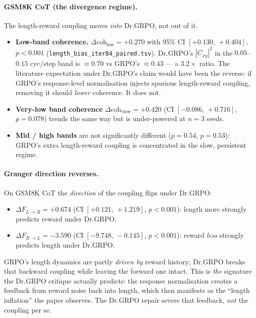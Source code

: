 \paragraph{GSM8K CoT (the divergence regime).}
The length-reward coupling moves \emph{into} Dr.GRPO, not out of it.
\begin{itemize}
\item \textbf{Low-band coherence.} $\Delta\mathrm{coh}_{\mathrm{low}}=+0.270$
with 95\% CI $[+0.130,\,+0.404]$, $p<0.001$
(\texttt{length\_bias\_iter84\_paired.tsv}). Dr.GRPO's $|C_{xy}|^2$
in the $0.05$--$0.15$ cyc/step band is $\approx 0.70$ vs GRPO's
$\approx 0.43$ --- a $3.2\times$ ratio. The literature expectation under
Dr.GRPO's claim would have been the reverse: if GRPO's response-level
normalisation injects spurious length-reward coupling, removing it should
\emph{lower} coherence. It does not.
\item \textbf{Very-low band coherence} $\Delta\mathrm{coh}_{\mathrm{vlow}}=+0.420$
(CI $[-0.086,\,+0.716]$, $p=0.078$) trends the same way but is under-powered
at $n=3$ seeds.
\item \textbf{Mid / high bands} are not significantly different
($p=0.54$, $p=0.53$): GRPO's extra length-reward coupling is concentrated
in the slow, persistent regime.
\end{itemize}

\paragraph{Granger direction reverses.}
On GSM8K CoT the \emph{direction} of the coupling flips under Dr.GRPO:
\begin{itemize}
\item $\Delta F_{L\to R}=+0.674$ (CI $[+0.121,\,+1.219]$, $p<0.001$):
length more strongly predicts reward under Dr.GRPO.
\item $\Delta F_{R\to L}=-3.590$ (CI $[-9.748,\,-0.145]$, $p<0.001$):
reward \emph{less} strongly predicts length under Dr.GRPO.
\end{itemize}
GRPO's length dynamics are partly \emph{driven by} reward history; Dr.GRPO
breaks that backward coupling while leaving the forward one intact. This is
\emph{the} signature the Dr.GRPO critique actually predicts: the response
normalisation creates a feedback from reward noise back into length, which
then manifests as the ``length inflation'' the paper observes.
The Dr.GRPO repair severs that feedback, \emph{not} the coupling per se.


